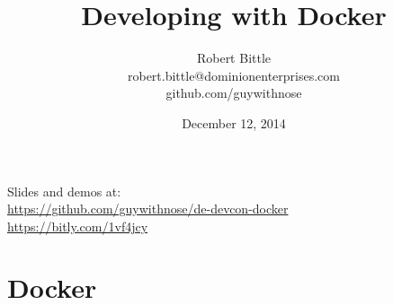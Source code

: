 \documentclass{beamer}
\title[Developing with Docker]{Developing with Docker}
\author{\hspace{12pt}Robert Bittle\hspace{12pt}\\\hspace{12pt}robert.bittle@dominionenterprises.com\hspace{12pt}\\\hspace{12pt}github.com/guywithnose\hspace{12pt}}
\date{December 12, 2014}
\begin{document}
    \begin{frame}
        \titlepage
        Slides and demos at:\\
        \href{https://github.com/guywithnose/de-devcon-docker}{https://github.com/guywithnose/de-devcon-docker}\\
        \href{https://bitly.com/1vf4jcy}{https://bitly.com/1vf4jcy}
    \end{frame}

    \section{Docker}
\end{document}
